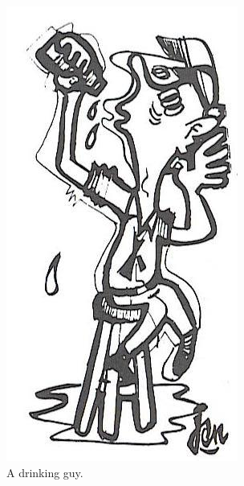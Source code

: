 \documentclass[a5paper]{article}
\begin{document}
\begin{figure}[ht!]
\centering
\includegraphics[width = 0.65\linewidth]{drinker.png}
\caption{A drinking guy.}
\end{figure}

\newpage
\end{document}
